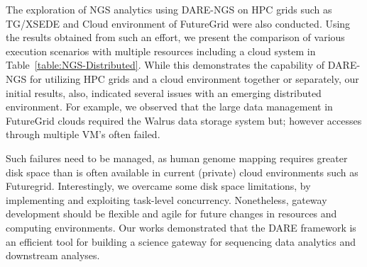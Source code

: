 \documentclass[]{svjour3}
\begin{document}

The exploration of NGS analytics using DARE-NGS 
on HPC grids such as TG/XSEDE and Cloud environment of
FutureGrid were also conducted\cite{ecmls11}. Using the results obtained from such an
effort, we present the comparison of various execution scenarios with
multiple resources including a cloud system in
Table~\ref{table:NGS-Distributed}. While this demonstrates the
capability of DARE-NGS for utilizing HPC grids and a cloud environment
together or separately, our initial results, also, indicated several
issues with an emerging distributed environment. For example, we
observed that the large data management in FutureGrid clouds required
the Walrus data storage system but; however accesses through multiple VM's
often failed.

Such failures need to be managed, as human genome mapping requires
greater disk space than is often available in current (private) cloud
environments such as Futuregrid. Interestingly, we overcame some disk
space limitations, by implementing and exploiting task-level
concurrency. Nonetheless, gateway development should be flexible and
agile for future changes in resources and computing environments. Our works demonstrated that the DARE framework is an efficient tool for building a science gateway for sequencing data analytics and downstream analyses.
\end{document}
